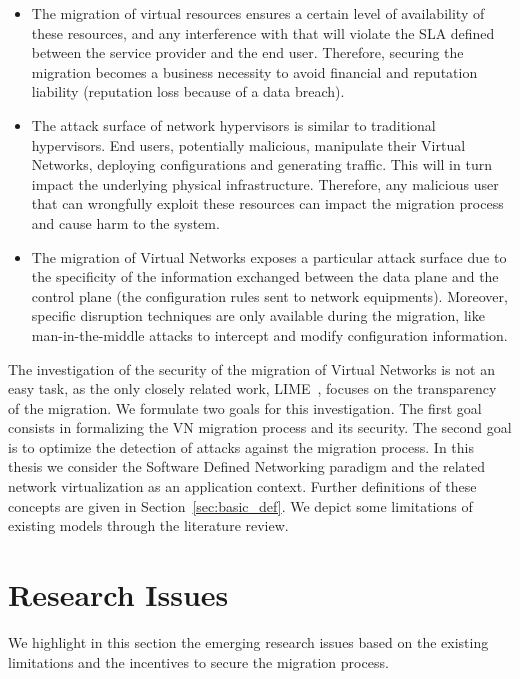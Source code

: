 \begin{itemize}
    
    \item The migration of virtual resources ensures a certain level of availability of these resources, and any interference with that will violate the SLA defined between the service provider and the end user.
    Therefore, securing the migration becomes a business necessity to avoid financial and reputation liability (\eg reputation loss because of a data breach).
    
    \item The attack surface of network hypervisors is similar to traditional hypervisors. End users, potentially malicious, manipulate their Virtual Networks, deploying configurations and generating traffic. This will in turn impact the underlying physical infrastructure. Therefore, any malicious user that can wrongfully exploit these resources can impact the migration process and cause harm to the system.

    \item The migration of Virtual Networks exposes a particular attack surface due to the specificity of the information exchanged between the data plane and the control plane (\eg the configuration rules sent to network equipments). Moreover, specific disruption techniques are only available during the migration, like man-in-the-middle attacks to intercept and modify configuration information.  
\end{itemize}

The investigation of the security of the migration of Virtual Networks is not an easy task, as the only closely related work, LIME~\cite{Lime-Ghorbani2014}, focuses on the transparency of the migration. 
We formulate two goals for this investigation.
The first goal consists in formalizing the VN migration process and its security.
The second goal is to optimize the detection of attacks against the migration process. In this thesis we consider the Software Defined Networking paradigm and the related network virtualization as an application context. Further definitions of these concepts are given in Section~\ref{sec:basic_def}. 
We depict some limitations of existing models through the literature review.


\section{Research Issues}
We highlight in this section the emerging research issues based on the existing limitations and the incentives to secure the migration process.

